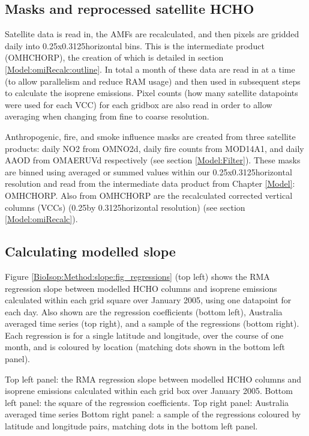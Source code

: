   \subsection{Masks and reprocessed satellite HCHO}
    
    Satellite data is read in, the AMFs are recalculated, and then pixels are gridded daily into 0.25x0.3125\degr horizontal bins. 
    This is the intermediate product (OMHCHORP), the creation of which is detailed in section \ref{Model:omiRecalc:outline}.
    In total a month of these data are read in at a time (to allow parallelism and reduce RAM usage) and then used in subsequent steps to calculate the isoprene emissions.
    Pixel counts (how many satellite datapoints were used for each VCC) for each gridbox are also read in order to allow averaging when changing from fine to coarse resolution.
    
    Anthropogenic, fire, and smoke influence masks are created from three satellite products: daily NO2 from OMNO2d, daily fire counts from MOD14A1, and daily AAOD from OMAERUVd respectively (see section \ref{Model:Filter}). These masks are binned using averaged or summed values within our 0.25x0.3125\degr horizontal resolution and read from the intermediate data product from Chapter \ref{Model}: OMHCHORP.
    Also from OMHCHORP are the recalculated corrected vertical columns (VCCs) (0.25\degr by 0.3125\degr horizontal resolution) (see section \ref{Model:omiRecalc}).
    
  \subsection{Calculating modelled slope}
  \label{BioIsop:Method:slope}
  
    Figure \ref{BioIsop:Method:slope:fig_regressions} (top left) shows the RMA regression slope between modelled HCHO columns and isoprene emissions calculated within each grid square over January 2005, using one datapoint for each day.
    Also shown are the regression coefficients (bottom left), Australia averaged time series (top right), and a sample of the regressions (bottom right).
    Each regression is for a single latitude and longitude, over the course of one month, and is coloured by location (matching dots shown in the bottom left panel).
    
    { %
      Top left panel: the RMA regression slope between modelled HCHO columns and isoprene emissions calculated within each grid box over January 2005.
      Bottom left panel: the square of the regression coefficients.
      Top right panel: Australia averaged time series 
      Bottom right panel: a sample of the regressions coloured by latitude and longitude pairs, matching dots in the bottom left panel.
    }
    {\label{BioIsop:Method:slope:fig_regressions}}
  
